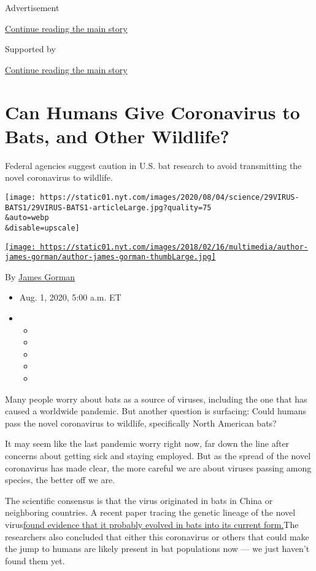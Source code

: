 Advertisement

\protect\hyperlink{after-top}{Continue reading the main story}

Supported by

\protect\hyperlink{after-sponsor}{Continue reading the main story}

\hypertarget{can-humans-give-coronavirus-to-bats-and-other-wildlife}{%
\section{Can Humans Give Coronavirus to Bats, and Other
Wildlife?}\label{can-humans-give-coronavirus-to-bats-and-other-wildlife}}

Federal agencies suggest caution in U.S. bat research to avoid
transmitting the novel coronavirus to wildlife.

\texttt{[image: https://static01.nyt.com/images/2020/08/04/science/29VIRUS-BATS1/29VIRUS-BATS1-articleLarge.jpg?quality=75\\\&auto=webp\\\&disable=upscale]}

\href{https://www.nytimes.com/by/james-gorman}{\texttt{[image: https://static01.nyt.com/images/2018/02/16/multimedia/author-james-gorman/author-james-gorman-thumbLarge.jpg]}}

By \href{https://www.nytimes.com/by/james-gorman}{James Gorman}

\begin{itemize}
\item
  Aug. 1, 2020, 5:00 a.m. ET
\item
  \begin{itemize}
  \item
  \item
  \item
  \item
  \item
  \end{itemize}
\end{itemize}

Many people worry about bats as a source of viruses, including the one
that has caused a worldwide pandemic. But another question is surfacing:
Could humans pass the novel coronavirus to wildlife, specifically North
American bats?

It may seem like the last pandemic worry right now, far down the line
after concerns about getting sick and staying employed. But as the
spread of the novel coronavirus has made clear, the more careful we are
about viruses passing among species, the better off we are.

The scientific consensus is that the virus originated in bats in China
or neighboring countries. A recent paper tracing the genetic lineage of
the novel
virus\href{https://www.nature.com/articles/s41564-020-0771-4}{found
evidence that it probably evolved in bats into its current form.}The
researchers also concluded that either this coronavirus or others that
could make the jump to humans are likely present in bat populations now
--- we just haven't found them yet.

